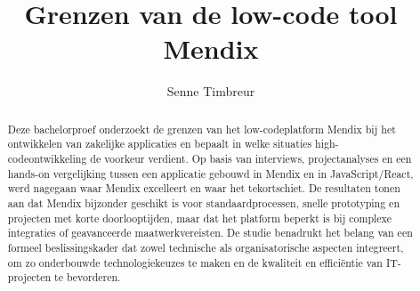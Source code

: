 \documentclass[a0,portrait]{hogent-poster}
\title{Grenzen van de low-code tool Mendix}
\author{Senne Timbreur}
\begin{document}
    \maketitle
    
    \begin{abstract}
        Deze bachelorproef onderzoekt de grenzen van het low-codeplatform Mendix bij het ontwikkelen van zakelijke applicaties en bepaalt in welke situaties high-codeontwikkeling de voorkeur verdient. Op basis van interviews, projectanalyses en een hands-on vergelijking tussen een applicatie gebouwd in Mendix en in JavaScript/React, werd nagegaan waar Mendix excelleert en waar het tekortschiet. De resultaten tonen aan dat Mendix bijzonder geschikt is voor standaardprocessen, snelle prototyping en projecten met korte doorlooptijden, maar dat het platform beperkt is bij complexe integraties of geavanceerde maatwerkvereisten. De studie benadrukt het belang van een formeel beslissingskader dat zowel technische als organisatorische aspecten integreert, om zo onderbouwde technologiekeuzes te maken en de kwaliteit en efficiëntie van IT-projecten te bevorderen.
    \end{abstract}
    
\end{document}
